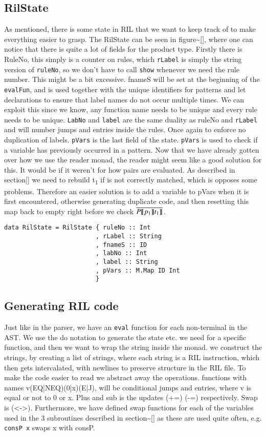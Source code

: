 \documentclass[a4paper]{article}
\begin{document}
\subsection{RilState}
\label{sec:orgf78172a}
As mentioned, there is some state in RIL that we want to keep track of to make everything easier to grasp. The RilState can be seen in figure\textasciitilde{}\ref{}, where one can notice that there is quite a lot of fields for the product type. Firstly there is RuleNo, this simply is a counter on rules, which \texttt{rLabel} is simply the string version of \texttt{ruleNo}, so we don't have to call \texttt{show} whenever we need the rule number. This might be a bit excessive. fnameS will be set at the beginning of the \texttt{evalFun}, and is used together with the unique identifiers for patterns and let declarations to ensure that label names do not occur multiple times. We can exploit this since we know, any function name needs to be unique and every rule needs to be unique. \texttt{LabNo} and \texttt{label} are the same duality as ruleNo and \texttt{rLabel} and will number jumps and entries inside the rules. Once again to enforce no duplication of labels. \texttt{pVars} is the last field of the state. \texttt{pVars} is used to check if a variable has previously occurred in a pattern. Now that we have already gotten over how we use the reader monad, the reader might seem like a good solution for this. It would be if it weren't for how pairs are evaluated. As described in section\ref{} we need to rebuild t\textsubscript{1} if is not correctly matched, which is opposes some problems. Therefore an easier solution is to add a variable to pVars when it is first encountered, otherwise generating duplicate code, and then resetting this map back to empty right before we check \(\overline{P \llbracket p_1\rrbracket t_1\rrbracket}\).
\begin{verbatim}
data RilState = RilState { ruleNo :: Int
                         , rLabel :: String
                         , fnameS :: ID
                         , labNo :: Int
                         , label :: String
                         , pVars :: M.Map ID Int
                         }
\end{verbatim}
\subsection{Generating RIL code}
\label{sec:orgd2308c6}
Just like in the parser, we have an \texttt{eval} function for each non-terminal in the AST. We use the do notation to generate the state etc. we need for a specific function, and then we want to wrap the string inside the monad. we construct the strings, by creating a list of strings, where each string is a RIL instruction, which then gets intercalated, with newlines to preserve structure in the RIL file. To make the code easier to read we abstract away the operations. functions with names v(EQ|NEQ)(0|x)(E|J), will be conditional jumps and entries, where v is equal or not to 0 or x. Plus and sub is the updates (+=) (-=) respectively. Swap is (<->). Furthermore, we have defined swap functions for each of the variables used in the 3 subroutines described in section\textasciitilde{}\ref{} as these are used quite often, e.g. \texttt{consP x} swaps x with consP.
\end{document}
